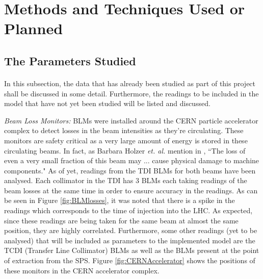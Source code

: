 \documentclass[12pt, twoside]{report}
\begin{document}
	
	
	\section{Methods and Techniques Used or Planned}
	\subsection{The Parameters Studied}
	\paragraph{ }In this subsection, the data that has already been studied as part of this project shall be discussed in some detail. Furthermore, the readings to be included in the model that have not yet been studied will be listed and discussed.
	
	\par \textit{Beam Loss Monitors:} BLMs were installed around the CERN particle accelerator complex to detect losses in the beam intensities as they're circulating. These monitors are safety critical as a very large amount of energy is stored in these circulating beams. In fact, as Barbara Holzer \textit{et. al.} mention in \cite{r:BLMs}, ``The loss of even a very small fraction of this beam may ... cause physical damage to machine components." As of yet, readings from the TDI BLMs for both beams have been analysed. Each collimator in the TDI has 3 BLMs each taking readings of the beam losses at the same time in order to ensure accuracy in the readings. As can be seen in Figure \ref{fig:BLMlosses}, it was noted that there is a spike in the readings which corresponds to the time of injection into the LHC. As expected, since these readings are being taken for the same beam at almost the same position, they are highly correlated. Furthermore, some other readings (yet to be analysed) that will be included as parameters to the implemented model are the TCDI (Transfer Line Collimator) BLMs as well as the BLMs present at the point of extraction from the SPS. Figure \ref{fig:CERNAccelerator} shows the positions of these monitors in the CERN accelerator complex.
	
\end{document}

